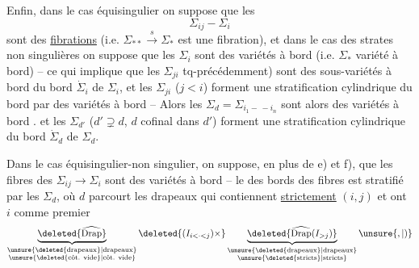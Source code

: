 Enfin, dans le cas équisingulier on suppose que les
\[
\Sigma_{ij}-\Sigma_i
\]
sont des \uline{fibrations} (i.e. $\Sigma_{**}\xrightarrow{s}\Sigma_*$ est une fibration), et dans le cas des strates non singulières on suppose que les $\Sigma_i$ sont des variétés à bord (i.e. $\Sigma_*$ variété à bord) -- ce qui implique que les $\Sigma_{ji}$  tq-précédemment) sont des sous-variétés à bord du  bord $\dot\Sigma_i$ de $\Sigma_i$, et les $\Sigma_{ji}$ ($j<i$) forment  une stratification cylindrique \margin{$*$}du \deleted{$\unsure{\Sigma_*}$} bord par des variétés à bord -- Alors les $\Sigma_d=\Sigma_{i_1-\, -i_n}$ sont alors des variétés à bord . et les $\Sigma_{d'}$ ($d'\supsetneq d$, $d$ cofinal dans $d'$)  forment une stratification cylindrique du bord  $\dot\Sigma_d$ de $\Sigma_d$.

Dans le cas équisingulier-non singulier, on suppose, en plus de e) et f), que les fibres des  $\Sigma_{ij}\longrightarrow\Sigma_i$ sont des variétés à bord -- le   des bords des fibres est  stratifié par les $\Sigma_d$, où $d$  parcourt les drapeaux qui contiennent \uline{strictement} \deleted{$\unsure{\Sigma}$} $(i,j)$ et ont $i$ comme premier
\[
\underbrace{\deleted{\widehat{\operatorname{Drap}}}}_{\substack{\text{\unsure{\deleted{drapeaux}|drapeaux}}\\\text{\unsure{\deleted{côt. vide}|côt. vide}}}}\deleted{(I_{i<\cdot<j})\times}
\underbrace{\deleted{\widehat{\operatorname{Drap}}(I_{>j})}}_{\substack{\text{\unsure{\deleted{drapeaux}|drapeaux}}\\\text{\unsure{\deleted{stricts}|stricts}}}}\unsure{,|)}
\]
